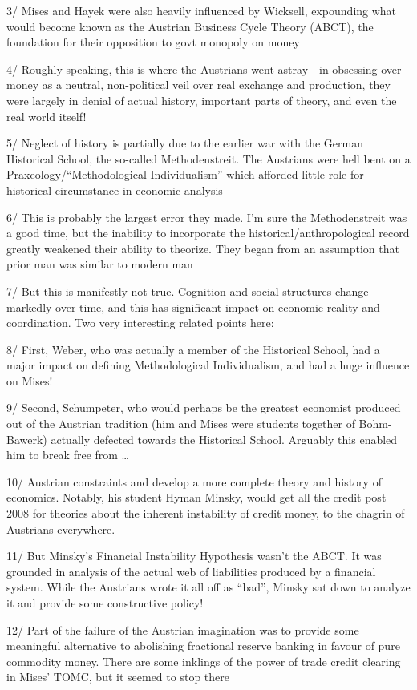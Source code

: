 \documentclass[
]{book}
\begin{document}
3/ Mises and Hayek were also heavily influenced by Wicksell, expounding what would become known as the Austrian Business Cycle Theory (ABCT), the foundation for their opposition to govt monopoly on money

4/ Roughly speaking, this is where the Austrians went astray - in obsessing over money as a neutral, non-political veil over real exchange and production, they were largely in denial of actual history, important parts of theory, and even the real world itself!

5/ Neglect of history is partially due to the earlier war with the German Historical School, the so-called Methodenstreit. The Austrians were hell bent on a Praxeology/``Methodological Individualism'' which afforded little role for historical circumstance in economic analysis

6/ This is probably the largest error they made. I'm sure the Methodenstreit was a good time, but the inability to incorporate the historical/anthropological record greatly weakened their ability to theorize. They began from an assumption that prior man was similar to modern man

7/ But this is manifestly not true. Cognition and social structures change markedly over time, and this has significant impact on economic reality and coordination. Two very interesting related points here:

8/ First, Weber, who was actually a member of the Historical School, had a major impact on defining Methodological Individualism, and had a huge influence on Mises!

9/ Second, Schumpeter, who would perhaps be the greatest economist produced out of the Austrian tradition (him and Mises were students together of Bohm-Bawerk) actually defected towards the Historical School. Arguably this enabled him to break free from \ldots{}

10/ Austrian constraints and develop a more complete theory and history of economics. Notably, his student Hyman Minsky, would get all the credit post 2008 for theories about the inherent instability of credit money, to the chagrin of Austrians everywhere.

11/ But Minsky's Financial Instability Hypothesis wasn't the ABCT. It was grounded in analysis of the actual web of liabilities produced by a financial system. While the Austrians wrote it all off as ``bad'', Minsky sat down to analyze it and provide some constructive policy!

12/ Part of the failure of the Austrian imagination was to provide some meaningful alternative to abolishing fractional reserve banking in favour of pure commodity money. There are some inklings of the power of trade credit clearing in Mises' TOMC, but it seemed to stop there
\end{document}

